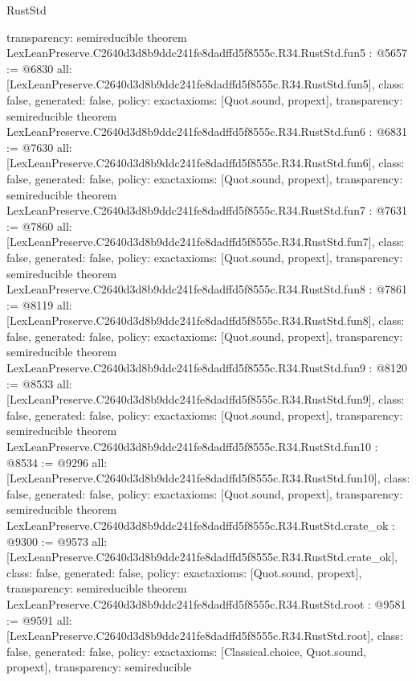 \begin{lexlean}{RustStd}
\begin{coremodule}
{  transparency: semireducible
}
theorem LexLeanPreserve.C2640d3d8b9ddc241fe8dadffd5f8555c.R34.RustStd.fun5 : @5657 := @6830 {
  all: [LexLeanPreserve.C2640d3d8b9ddc241fe8dadffd5f8555c.R34.RustStd.fun5],
  class: false,
  generated: false,
  policy: exact{axioms: [Quot.sound, propext]},
  transparency: semireducible
}
theorem LexLeanPreserve.C2640d3d8b9ddc241fe8dadffd5f8555c.R34.RustStd.fun6 : @6831 := @7630 {
  all: [LexLeanPreserve.C2640d3d8b9ddc241fe8dadffd5f8555c.R34.RustStd.fun6],
  class: false,
  generated: false,
  policy: exact{axioms: [Quot.sound, propext]},
  transparency: semireducible
}
theorem LexLeanPreserve.C2640d3d8b9ddc241fe8dadffd5f8555c.R34.RustStd.fun7 : @7631 := @7860 {
  all: [LexLeanPreserve.C2640d3d8b9ddc241fe8dadffd5f8555c.R34.RustStd.fun7],
  class: false,
  generated: false,
  policy: exact{axioms: [Quot.sound, propext]},
  transparency: semireducible
}
theorem LexLeanPreserve.C2640d3d8b9ddc241fe8dadffd5f8555c.R34.RustStd.fun8 : @7861 := @8119 {
  all: [LexLeanPreserve.C2640d3d8b9ddc241fe8dadffd5f8555c.R34.RustStd.fun8],
  class: false,
  generated: false,
  policy: exact{axioms: [Quot.sound, propext]},
  transparency: semireducible
}
theorem LexLeanPreserve.C2640d3d8b9ddc241fe8dadffd5f8555c.R34.RustStd.fun9 : @8120 := @8533 {
  all: [LexLeanPreserve.C2640d3d8b9ddc241fe8dadffd5f8555c.R34.RustStd.fun9],
  class: false,
  generated: false,
  policy: exact{axioms: [Quot.sound, propext]},
  transparency: semireducible
}
theorem LexLeanPreserve.C2640d3d8b9ddc241fe8dadffd5f8555c.R34.RustStd.fun10 : @8534 := @9296 {
  all: [LexLeanPreserve.C2640d3d8b9ddc241fe8dadffd5f8555c.R34.RustStd.fun10],
  class: false,
  generated: false,
  policy: exact{axioms: [Quot.sound, propext]},
  transparency: semireducible
}
theorem LexLeanPreserve.C2640d3d8b9ddc241fe8dadffd5f8555c.R34.RustStd.crate_ok : @9300 := @9573 {
  all: [LexLeanPreserve.C2640d3d8b9ddc241fe8dadffd5f8555c.R34.RustStd.crate_ok],
  class: false,
  generated: false,
  policy: exact{axioms: [Quot.sound, propext]},
  transparency: semireducible
}
theorem LexLeanPreserve.C2640d3d8b9ddc241fe8dadffd5f8555c.R34.RustStd.root : @9581 := @9591 {
  all: [LexLeanPreserve.C2640d3d8b9ddc241fe8dadffd5f8555c.R34.RustStd.root],
  class: false,
  generated: false,
  policy: exact{axioms: [Classical.choice, Quot.sound, propext]},
  transparency: semireducible
}


\end{coremodule}
\end{lexlean}
